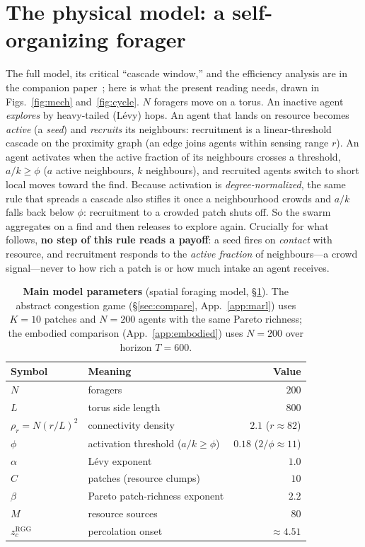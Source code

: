 \documentclass{article}
\begin{document}
\section{The physical model: a self-organizing forager}
\label{sec:mech}
The full model, its critical ``cascade window,'' and the efficiency analysis are in the companion
paper~\citep{partI}; here is what the present reading needs, drawn in Figs.~\ref{fig:mech} and~\ref{fig:cycle}.
$N$ foragers move on a torus. An inactive agent \emph{explores} by heavy-tailed (L\'evy) hops. An agent that
lands on resource becomes \emph{active} (a \emph{seed}) and \emph{recruits} its neighbours: recruitment is a
linear-threshold cascade on the proximity graph (an edge joins agents within sensing range $r$). An agent
activates when the active fraction of its neighbours crosses a threshold, $a/k\ge\phi$ ($a$ active neighbours,
$k$ neighbours), and recruited agents switch to short local moves toward the find. Because activation is
\emph{degree-normalized}, the same rule that spreads a cascade also stifles it once a neighbourhood crowds and
$a/k$ falls back below $\phi$: recruitment to a crowded patch shuts off. So the swarm aggregates on a find and
then releases to explore again. Crucially for what follows, \textbf{no step of this rule reads a payoff}: a
seed fires on \emph{contact} with resource, and recruitment responds to the \emph{active fraction} of
neighbours---a crowd signal---never to how rich a patch is or how much intake an agent receives.

\begin{table}[t]
\centering
{\small
\begin{tabular}{@{}llr@{}}
\hline
\textbf{Symbol} & \textbf{Meaning} & \textbf{Value} \\
\hline
$N$ & foragers & $200$ \\
$L$ & torus side length & $800$ \\
$\rho_r=N(r/L)^2$ & connectivity density & $2.1$ ($r\approx82$) \\
$\phi$ & activation threshold ($a/k\ge\phi$) & $0.18$ ($2/\phi\approx11$) \\
$\alpha$ & L\'evy exponent & $1.0$ \\
$C$ & patches (resource clumps) & $10$ \\
$\beta$ & Pareto patch-richness exponent & $2.2$ \\
$M$ & resource sources & $80$ \\
$z_c^{\mathrm{RGG}}$ & percolation onset & ${\approx}4.51$ \\
\hline
\end{tabular}}
\caption{\textbf{Main model parameters} (spatial foraging model, \S\ref{sec:mech}). The abstract congestion
game (\S\ref{sec:compare}, App.~\ref{app:marl}) uses $K{=}10$ patches and $N{=}200$ agents with the same Pareto
richness; the embodied comparison (App.~\ref{app:embodied}) uses $N{=}200$ over horizon $T{=}600$.}
\label{tab:params}
\end{table}
\end{document}
